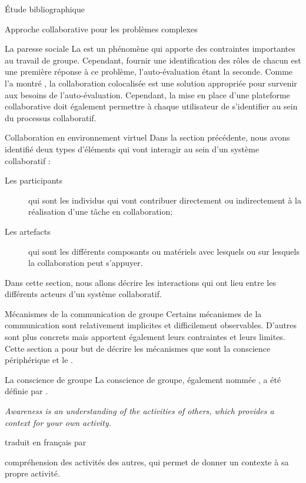 \documentclass[myfrancais,ngerman,english,french]{mythesis}
\begin{document}
\begin{mychapter}{Étude bibliographique}
\begin{mysection}{Approche collaborative pour les problèmes complexes}
\begin{mysubsection}{La paresse sociale}
				La  est un phénomène qui apporte des contraintes importantes au travail de groupe.
				Cependant, fournir une identification des rôles de chacun est une première réponse à ce problème, l'auto-évaluation étant la seconde.
				Comme l'a montré , la collaboration colocalisée est une solution appropriée pour survenir aux besoins de l'auto-évaluation.
				Cependant, la mise en place d'une plateforme collaborative doit également permettre à chaque utilisateur de s'identifier au sein du processus collaboratif.
			\end{mysubsection}
		\end{mysection}
		\begin{mysection}{Collaboration en environnement virtuel}
			Dans la section précédente, nous avons identifié deux types d'éléments qui vont interagir au sein d'un système collaboratif :
			\begin{description}
				\item[Les participants] qui sont les individus qui vont contribuer directement ou indirectement à la réalisation d'une tâche en collaboration;
				\item[Les artefacts] qui sont les différents composants ou matériels avec lesquels ou sur lesquels la collaboration peut s'appuyer.
			\end{description}
			Dans cette section, nous allons décrire les interactions qui ont lieu entre les différents acteurs d'un système collaboratif.
			\begin{mysubsection}{Mécanismes de la communication de groupe}
				Certains mécanismes de la communication sont relativement implicites et difficilement observables.
				D'autres sont plus concrets mais apportent également leurs contraintes et leurs limites.
				Cette section a pour but de décrire les mécanismes que sont la conscience périphérique et le \mygrounding.
				\begin{mysubsubsection}{La conscience de groupe}
					La conscience de groupe, également nommée \myawareness, a été définie par .
					\begin{myquote}[english]
						\it Awareness is an understanding of the activities of others, which provides a context for your own activity.
					\end{myquote}
					traduit en français par 
					\begin{myquote} compréhension des activités des autres, qui permet de donner un contexte à sa propre activité.
					\end{myquote}


\end{mysubsubsection}
\end{mysubsection}
\end{mysection}
\end{mychapter}
\end{document}
